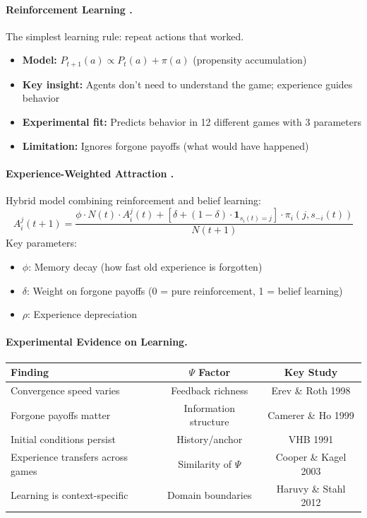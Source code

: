 \paragraph{Reinforcement Learning \citep{rotherev1995,erevandorth1998}.}
The simplest learning rule: repeat actions that worked.
\begin{itemize}[nosep]
    \item \textbf{Model:} $P_{t+1}(a) \propto P_t(a) + \pi(a)$ (propensity accumulation)
    \item \textbf{Key insight:} Agents don't need to understand the game; experience guides behavior
    \item \textbf{Experimental fit:} Predicts behavior in 12 different games with 3 parameters
    \item \textbf{Limitation:} Ignores forgone payoffs (what would have happened)
\end{itemize}

\paragraph{Experience-Weighted Attraction \citep{camererho1999}.}
Hybrid model combining reinforcement and belief learning:
\begin{equation}
A_i^j(t+1) = \frac{\phi \cdot N(t) \cdot A_i^j(t) + [\delta + (1-\delta) \cdot \mathbf{1}_{s_i(t)=j}] \cdot \pi_i(j, s_{-i}(t))}{N(t+1)}
\tag{EV-EWA}
\end{equation}
Key parameters:
\begin{itemize}[nosep]
    \item $\phi$: Memory decay (how fast old experience is forgotten)
    \item $\delta$: Weight on forgone payoffs (0 = pure reinforcement, 1 = belief learning)
    \item $\rho$: Experience depreciation
\end{itemize}

\paragraph{Experimental Evidence on Learning.}
\begin{center}
\small
\begin{tabular}{@{}lcc@{}}
\toprule
\textbf{Finding} & \textbf{$\Psi$ Factor} & \textbf{Key Study} \\
\midrule
Convergence speed varies & Feedback richness & Erev \& Roth 1998 \\
Forgone payoffs matter & Information structure & Camerer \& Ho 1999 \\
Initial conditions persist & History/anchor & VHB 1991 \\
Experience transfers across games & Similarity of $\Psi$ & Cooper \& Kagel 2003 \\
Learning is context-specific & Domain boundaries & Haruvy \& Stahl 2012 \\
\bottomrule
\end{tabular}
\end{center}

